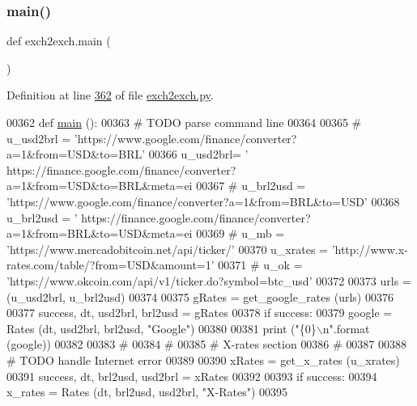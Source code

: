 \subsubsection{\texorpdfstring{main()}{main()}}
{\footnotesize\ttfamily def exch2exch.\+main (\begin{DoxyParamCaption}{ }\end{DoxyParamCaption})}



Definition at line \hyperlink{exch2exch_8py_source_l00362}{362} of file \hyperlink{exch2exch_8py_source}{exch2exch.\+py}.


\begin{DoxyCode}
00362 \textcolor{keyword}{def }\hyperlink{namespaceexch2exch_a4a7d6bc2c47add0970ca3e0c28a5cb63}{main} ():
00363     \textcolor{comment}{# TODO parse command line }
00364 
00365     \textcolor{comment}{# u\_usd2brl = 'https://www.google.com/finance/converter?a=1&from=USD&to=BRL'}
00366     u\_usd2brl= \textcolor{stringliteral}{'
      https://finance.google.com/finance/converter?a=1&from=USD&to=BRL&meta=ei%
00367 \textcolor{comment}{#    u\_brl2usd = 'https://www.google.com/finance/converter?a=1&from=BRL&to=USD'}
00368     u\_brl2usd = \textcolor{stringliteral}{'
      https://finance.google.com/finance/converter?a=1&from=BRL&to=USD&meta=ei%
00369 \textcolor{comment}{#    u\_mb      = 'https://www.mercadobitcoin.net/api/ticker/'}
00370     u\_xrates  = \textcolor{stringliteral}{'http://www.x-rates.com/table/?from=USD&amount=1'}
00371 \textcolor{comment}{#    u\_ok      = 'https://www.okcoin.com/api/v1/ticker.do?symbol=btc\_usd'}
00372     
00373     urls = (u\_usd2brl, u\_brl2usd)
00374     
00375     gRates = get\_google\_rates (urls)
00376     
00377     success, dt, usd2brl, brl2usd = gRates
00378     \textcolor{keywordflow}{if} success:   
00379         google = Rates (dt, usd2brl, brl2usd, \textcolor{stringliteral}{"Google"})
00380     
00381         \textcolor{keywordflow}{print} (\textcolor{stringliteral}{"\{0\}\(\backslash\)n"}.format (google))
00382     
00383     \textcolor{comment}{#}
00384     \textcolor{comment}{#}
00385     \textcolor{comment}{# X-rates section }
00386     \textcolor{comment}{# }
00387     
00388     \textcolor{comment}{# TODO handle Internet error }
00389 
00390     xRates = get\_x\_rates (u\_xrates)
00391     success, dt, brl2usd, usd2brl = xRates
00392     
00393     \textcolor{keywordflow}{if} success:
00394         x\_rates = Rates (dt, brl2usd, usd2brl, \textcolor{stringliteral}{"X-Rates"})
00395     
}}
\end{DoxyCode}
